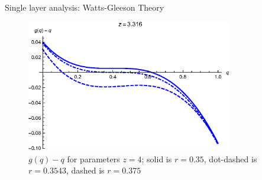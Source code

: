\documentclass[10pt, xcolor=dvipsnames]{beamer}
\begin{document}
\begin{frame}{Single layer analysis: Watts-Gleeson Theory}
\begin{figure}[htb]
\includegraphics[width=0.8\textwidth]{figures/single_gq_critical}
\caption{$g(q)-q$ for parameters $z=4$;  solid is $r=0.35$, dot-dashed is $r=0.3543$, dashed is $r=0.375$}
\end{figure}

\end{frame}
\end{document}
